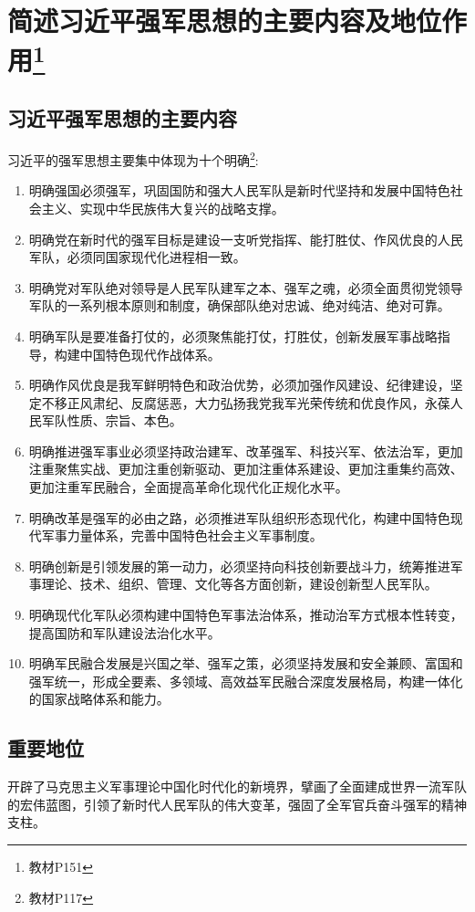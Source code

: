\documentclass[lang=cn,newtx,12pt,scheme=chinese]{elegantbook}
\begin{document}
\chapter{简述习近平强军思想的主要内容及地位作用\footnote{教材P151}}
\section{习近平强军思想的主要内容}
习近平的强军思想主要集中体现为十个明确\footnote{教材P117}:

\begin{enumerate}
  \item 明确强国必须强军，巩固国防和强大人民军队是新时代坚持和发展中国特色社会主义、实现中华民族伟大复兴的战略支撑。
  \item 明确党在新时代的强军目标是建设一支听党指挥、能打胜仗、作风优良的人民军队，必须同国家现代化进程相一致。
  \item 明确党对军队绝对领导是人民军队建军之本、强军之魂，必须全面贯彻党领导军队的一系列根本原则和制度，确保部队绝对忠诚、绝对纯洁、绝对可靠。
  \item 明确军队是要准备打仗的，必须聚焦能打仗，打胜仗，创新发展军事战略指导，构建中国特色现代作战体系。
  \item 明确作风优良是我军鲜明特色和政治优势，必须加强作风建设、纪律建设，坚定不移正风肃纪、反腐惩恶，大力弘扬我党我军光荣传统和优良作风，永葆人民军队性质、宗旨、本色。
  \item 明确推进强军事业必须坚持政治建军、改革强军、科技兴军、依法治军，更加注重聚焦实战、更加注重创新驱动、更加注重体系建设、更加注重集约高效、更加注重军民融合，全面提高革命化现代化正规化水平。
  \item 明确改革是强军的必由之路，必须推进军队组织形态现代化，构建中国特色现代军事力量体系，完善中国特色社会主义军事制度。
  \item 明确创新是引领发展的第一动力，必须坚持向科技创新要战斗力，统筹推进军事理论、技术、组织、管理、文化等各方面创新，建设创新型人民军队。
  \item 明确现代化军队必须构建中国特色军事法治体系，推动治军方式根本性转变，提高国防和军队建设法治化水平。
  \item 明确军民融合发展是兴国之举、强军之策，必须坚持发展和安全兼顾、富国和强军统一，形成全要素、多领域、高效益军民融合深度发展格局，构建一体化的国家战略体系和能力。
\end{enumerate}

\section{重要地位}
开辟了马克思主义军事理论中国化时代化的新境界，擘画了全面建成世界一流军队的宏伟蓝图，引领了新时代人民军队的伟大变革，强固了全军官兵奋斗强军的精神支柱。
\end{document}
